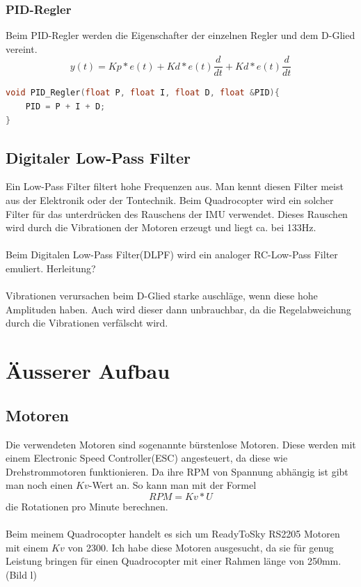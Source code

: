 \documentclass[12pt,a4paper, ngerman]{article}
\begin{document}
\subsubsection{PID-Regler}
Beim PID-Regler werden die Eigenschafter der einzelnen Regler und dem D-Glied vereint.
\begin{equation}
y(t)=Kp*e(t)+Kd*e(t)\frac{d}{dt}+Kd*e(t)\frac{d}{dt}
\end{equation}
\begin{lstlisting}[language=C++,caption=D-Regler C++ Pseudocode]
void PID_Regler(float P, float I, float D, float &PID){
	PID = P + I + D;
}
\end{lstlisting}
\subsection{Digitaler Low-Pass Filter}
Ein Low-Pass Filter filtert hohe Frequenzen aus. Man kennt diesen Filter meist aus der Elektronik oder der Tontechnik. Beim Quadrocopter wird ein solcher Filter für das unterdrücken des Rauschens der IMU verwendet. Dieses Rauschen wird durch die Vibrationen der Motoren erzeugt und liegt ca. bei 133Hz.\\ \\
Beim Digitalen Low-Pass Filter(DLPF) wird ein analoger RC-Low-Pass Filter emuliert.
Herleitung? \\ \\ 
Vibrationen verursachen beim D-Glied starke auschläge, wenn diese hohe Amplituden haben. Auch wird dieser dann unbrauchbar, da die Regelabweichung durch die Vibrationen verfälscht wird.
\newpage
\section{Äusserer Aufbau}
\subsection{Motoren}
Die verwendeten Motoren sind sogenannte bürstenlose Motoren. Diese werden mit einem Electronic Speed Controller(ESC) angesteuert, da diese wie Drehstrommotoren funktionieren. Da ihre RPM von Spannung abhängig ist gibt man noch einen $Kv$-Wert an. So kann man mit der Formel
\begin{equation}
RPM=Kv*U
\end{equation}
die Rotationen pro Minute berechnen.\\ \\
Beim meinem Quadrocopter handelt es sich um ReadyToSky RS2205 Motoren mit einem $Kv$ von 2300. Ich habe diese Motoren ausgesucht, da sie für genug Leistung bringen für einen Quadrocopter mit einer Rahmen länge von 250mm.(Bild l)
\end{document}
